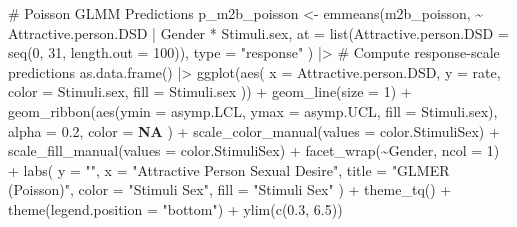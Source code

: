 \documentclass[
  bookmarksnumbered]{article}
\newenvironment{Shaded}{\begin{snugshade}}{\end{snugshade}}
\newcommand{\AttributeTok}[1]{\textcolor[rgb]{0.80,0.80,0.80}{#1}}
\newcommand{\CommentTok}[1]{\textcolor[rgb]{0.50,0.62,0.50}{#1}}
\newcommand{\ConstantTok}[1]{\textcolor[rgb]{0.86,0.64,0.64}{\textbf{#1}}}
\newcommand{\DecValTok}[1]{\textcolor[rgb]{0.86,0.86,0.80}{#1}}
\newcommand{\FloatTok}[1]{\textcolor[rgb]{0.75,0.75,0.82}{#1}}
\newcommand{\FunctionTok}[1]{\textcolor[rgb]{0.94,0.94,0.56}{#1}}
\newcommand{\NormalTok}[1]{\textcolor[rgb]{0.80,0.80,0.80}{#1}}
\newcommand{\OtherTok}[1]{\textcolor[rgb]{0.94,0.94,0.56}{#1}}
\newcommand{\SpecialCharTok}[1]{\textcolor[rgb]{0.86,0.64,0.64}{#1}}
\newcommand{\StringTok}[1]{\textcolor[rgb]{0.80,0.58,0.58}{#1}}
\begin{document}
\begin{Shaded}
\begin{Highlighting}[]
\CommentTok{\# Poisson GLMM Predictions}
\NormalTok{p\_m2b\_poisson }\OtherTok{\textless{}{-}} \FunctionTok{emmeans}\NormalTok{(m2b\_poisson, }\SpecialCharTok{\textasciitilde{}}\NormalTok{ Attractive.person.DSD }\SpecialCharTok{|}\NormalTok{ Gender }\SpecialCharTok{*}\NormalTok{ Stimuli.sex,}
  \AttributeTok{at =} \FunctionTok{list}\NormalTok{(}\AttributeTok{Attractive.person.DSD =} \FunctionTok{seq}\NormalTok{(}\DecValTok{0}\NormalTok{, }\DecValTok{31}\NormalTok{, }\AttributeTok{length.out =} \DecValTok{100}\NormalTok{)),}
  \AttributeTok{type =} \StringTok{"response"}
\NormalTok{) }\SpecialCharTok{|\textgreater{}} \CommentTok{\# Compute response{-}scale predictions}
  \FunctionTok{as.data.frame}\NormalTok{() }\SpecialCharTok{|\textgreater{}}
  \FunctionTok{ggplot}\NormalTok{(}\FunctionTok{aes}\NormalTok{(}
    \AttributeTok{x =}\NormalTok{ Attractive.person.DSD, }\AttributeTok{y =}\NormalTok{ rate,}
    \AttributeTok{color =}\NormalTok{ Stimuli.sex, }\AttributeTok{fill =}\NormalTok{ Stimuli.sex}
\NormalTok{  )) }\SpecialCharTok{+}
  \FunctionTok{geom\_line}\NormalTok{(}\AttributeTok{size =} \DecValTok{1}\NormalTok{) }\SpecialCharTok{+}
  \FunctionTok{geom\_ribbon}\NormalTok{(}\FunctionTok{aes}\NormalTok{(}\AttributeTok{ymin =}\NormalTok{ asymp.LCL, }\AttributeTok{ymax =}\NormalTok{ asymp.UCL, }\AttributeTok{fill =}\NormalTok{ Stimuli.sex),}
    \AttributeTok{alpha =} \FloatTok{0.2}\NormalTok{, }\AttributeTok{color =} \ConstantTok{NA}
\NormalTok{  ) }\SpecialCharTok{+}
  \FunctionTok{scale\_color\_manual}\NormalTok{(}\AttributeTok{values =}\NormalTok{ color.StimuliSex) }\SpecialCharTok{+}
  \FunctionTok{scale\_fill\_manual}\NormalTok{(}\AttributeTok{values =}\NormalTok{ color.StimuliSex) }\SpecialCharTok{+}
  \FunctionTok{facet\_wrap}\NormalTok{(}\SpecialCharTok{\textasciitilde{}}\NormalTok{Gender, }\AttributeTok{ncol =} \DecValTok{1}\NormalTok{) }\SpecialCharTok{+}
  \FunctionTok{labs}\NormalTok{(}
    \AttributeTok{y =} \StringTok{""}\NormalTok{, }\AttributeTok{x =} \StringTok{"Attractive Person Sexual Desire"}\NormalTok{,}
    \AttributeTok{title =} \StringTok{"GLMER (Poisson)"}\NormalTok{,}
    \AttributeTok{color =} \StringTok{"Stimuli Sex"}\NormalTok{, }\AttributeTok{fill =} \StringTok{"Stimuli Sex"}
\NormalTok{  ) }\SpecialCharTok{+}
  \FunctionTok{theme\_tq}\NormalTok{() }\SpecialCharTok{+}
  \FunctionTok{theme}\NormalTok{(}\AttributeTok{legend.position =} \StringTok{"bottom"}\NormalTok{) }\SpecialCharTok{+}
  \FunctionTok{ylim}\NormalTok{(}\FunctionTok{c}\NormalTok{(}\FloatTok{0.3}\NormalTok{, }\FloatTok{6.5}\NormalTok{))}


\end{Highlighting}
\end{Shaded}
\end{document}
